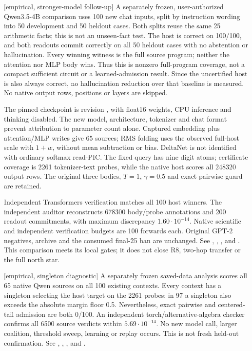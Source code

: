 \documentclass[11pt]{article}
\newcommand{\status}[1]{\textsf{[#1]}}
\begin{document}
\status{empirical, stronger-model follow-up} A separately frozen,
user-authorized Qwen3.5-4B comparison uses 100 new chat inputs, split by
instruction wording into 50 development and 50 heldout cases. Both splits
reuse the same 25 arithmetic facts; this is not an unseen-fact test.
The host is correct on 100/100, and both readouts commit correctly on all
50 heldout cases with no abstention or hallucination. Every winning
witness is the full source program; neither the attention nor MLP body
wins. Thus this is nonzero full-program coverage, not a compact sufficient
circuit or a learned-admission result. Since the uncertified host is also
always correct, no hallucination reduction over that baseline is measured.
No native output rows, positions or layers are skipped.

The pinned checkpoint is  revision
, with float16 weights,
CPU inference and thinking disabled. The new model, architecture, tokenizer
and chat format prevent attribution to parameter count alone. Captured
embedding plus attention/MLP writes give 65 sources; RMS folding uses the
observed full-host scale with $1+w$, without mean subtraction or bias.
DeltaNet is not identified with ordinary softmax read-PIC. The fixed query
has nine digit atoms; certificate coverage is 2261 tokenizer-text probes,
while the native host scores all 248320 output rows. The original three
bodies, $T=1$, $\gamma=0.5$ and exact pairwise guard are retained.

Independent Transformers verification matches all 100 host winners. The
independent auditor reconstructs 678300 body/probe annotations and 200
readout commitments, with maximum discrepancy $1.60\cdot10^{-14}$.
Native scientific and independent verification budgets are 100 forwards
each. Original GPT-2 negatives, archive and the consumed final-25 ban are
unchanged. See ,
, , and .
This comparison meets its local gates; it does not close R8, two-hop
transfer or the full north star.

\status{empirical, singleton diagnostic} A separately frozen saved-data
analysis scores all 65 native Qwen sources on all 100 existing contexts.
Every context has a singleton selecting the host target on the 2261 probes;
in 97 a singleton also exceeds the absolute margin floor 0.5. Nevertheless,
exact pairwise and centered-tail admission are both 0/100. An independent
torch/alternative-algebra checker confirms all 6500 source verdicts within
$5.69\cdot10^{-14}$. No new model call, larger coalition, threshold sweep,
learning or replay occurs. This is not fresh held-out confirmation.
See ,
, , and .
\end{document}

